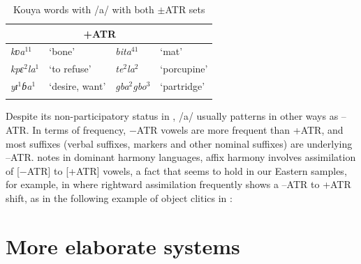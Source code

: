 \documentclass[output=paper,newtxmath,modfonts,nonflat,draft]{langsci/langscibook}
\begin{document}
\begin{table}
\caption{Kouya words with /a/ with both $\pm$ATR sets}
\label{tab:zogbo:2b}
  
\begin{tabular}{llll}

\lsptoprule
\multicolumn{2}{c}{−ATR} & \multicolumn{2}{c}{+ATR} \\
\midrule
\textit{kʋa}$^{11}$ & ‘bone’ & \textit{bita}$^{41}$ & ‘mat’ \\

\textit{{kp}ɛ}$^2$\textit{{l}a}$^1$ & {‘to refuse’} & \textit{te}$^2$\textit{la}$^2$ & ‘porcupine’ \\

\textit{yɪ}$^1$\textit{ɓa}$^1$ & ‘desire, want’ & \textit{gba}$^2$\textit{gbo}$^3$ & ‘partridge’ \\ 
\lspbottomrule
\end{tabular}
\end{table}

  
Despite its non-participatory status in , /a/ usually patterns in other ways as –ATR. In terms of frequency, −ATR vowels are more frequent than +ATR, and most suffixes (verbal suffixes,  markers and other nominal suffixes) are underlying –ATR. \citet{Casali2008} notes in dominant harmony languages, affix harmony involves assimilation of [$-$ATR] to [+ATR] vowels, a fact that seems to hold in our Eastern  samples, for example, in  where rightward assimilation frequently shows a –ATR to +ATR shift, as in the following example of object clitics in :


\ea
    \label{ex:zogbo:3}
		 \citep{Marchese1975}
    \z






\section{More elaborate systems}\label{sec:zogbo:2} 
\end{document}
